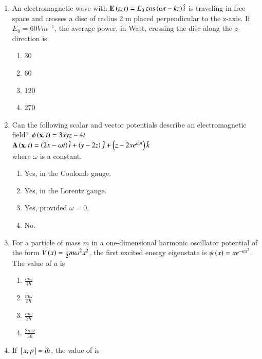 \documentclass[journal]{IEEEtran}
\begin{document}
\begin{enumerate}[start=35]
	\item An electromagnetic wave with $\mathbf{E}\left(z,t\right)=E_0\cos\left(\omega t-kz\right)\hat{i}$ is traveling in free space and crosses a disc of radius 2 m placed perpendicular to the z-axis. If $E_0=60 V m^{-1}$, the average power, in Watt, crossing the disc along the $z$-direction is 
\begin{multicols}{4}
\begin{enumerate}
    \item 30
    \item 60
    \item 120
    \item 270
\end{enumerate}
\end{multicols}
\item Can the following scalar and vector potentials describe an electromagnetic field? 
$\phi\left(\mathbf{x},t\right)=3xyz-4t$ \\
$\mathbf{A}\left(\mathbf{x},t\right)=\left(2x-\omega t\right)\hat{i}+\left(y-2z\right)\hat{j}+\left(z-2xe^{i\omega t}\right)\hat{k}$
\\ where $\omega$ is a constant.
\begin{multicols}{2}
    \begin{enumerate}
        \item Yes, in the Coulomb gauge.
        \item Yes, in the Lorentz gauge.
        \item Yes, provided $\omega = 0$.
        \item No.
    \end{enumerate}
\end{multicols}
\item For a particle of mass $m$ in a one-dimensional harmonic oscillator potential of the form $V\left(x\right)=\frac{1}{2}m{\omega}^2x^2$, the first excited energy eigenstate is $\psi \left(x\right)=xe^{-ax^2}$. The value of $a$ is
\begin{multicols}{4}
    \begin{enumerate}
	    \item $\frac{m\omega}{4\hbar}$
	    \item $\frac{m\omega}{3\hbar}$
	    \item $\frac{m\omega}{2\hbar}$
	    \item $\frac{2m\omega}{3\hbar}$
    \end{enumerate}
\end{multicols}
\item If ${}\left[x,p\right]=i\hbar$, the value of  is

\end{enumerate}
\end{document}

